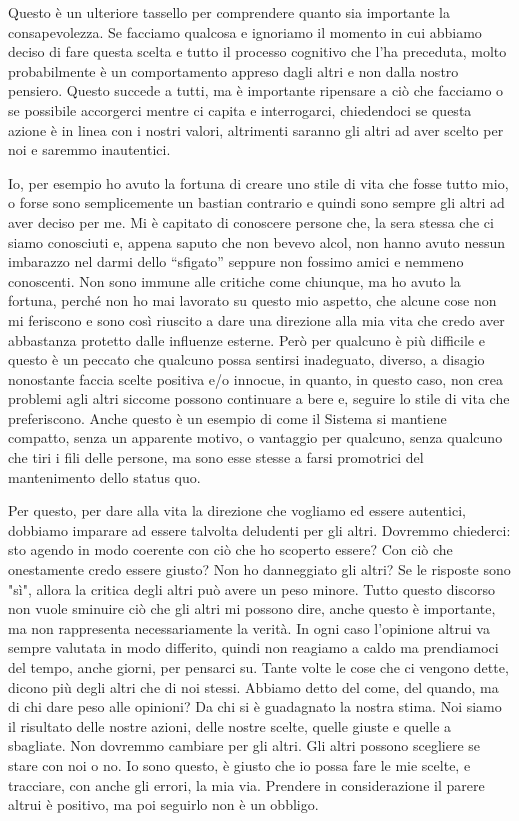 \documentclass[12pt]{book} %
\begin{document}
\bigskip

Questo è un ulteriore tassello per comprendere quanto sia importante la consapevolezza. Se facciamo qualcosa e ignoriamo
il momento in cui abbiamo deciso di fare questa scelta e tutto il processo cognitivo che l'ha
preceduta, molto probabilmente è un comportamento appreso dagli altri e non dalla nostro pensiero. Questo succede a
tutti, ma è importante ripensare a ciò che facciamo o se possibile accorgerci mentre ci capita e interrogarci,
chiedendoci se questa azione è in linea con i nostri valori, altrimenti saranno gli altri ad aver scelto per noi e
saremmo inautentici.


\bigskip

Io, per esempio ho avuto la fortuna di creare uno stile di vita che fosse tutto mio, o forse sono semplicemente un
bastian contrario e quindi sono sempre gli altri ad aver deciso per me. Mi è capitato di conoscere persone che, la sera
stessa che ci siamo conosciuti e, appena saputo che non bevevo alcol, non hanno avuto nessun imbarazzo nel darmi dello
“sfigato” seppure non fossimo amici e nemmeno conoscenti. Non sono immune alle critiche come chiunque, ma ho avuto la
fortuna, perché non ho mai lavorato su questo mio aspetto, che alcune cose non mi feriscono e sono così riuscito a dare
una direzione alla mia vita che credo aver abbastanza protetto dalle influenze esterne. Però per qualcuno è più
difficile e questo è un peccato che qualcuno possa sentirsi inadeguato, diverso, a disagio nonostante faccia scelte
positiva e/o innocue, in quanto, in questo caso, non crea problemi agli altri siccome possono continuare a bere e,
seguire lo stile di vita che preferiscono. Anche questo è un esempio di come il Sistema si mantiene compatto, senza un
apparente motivo, o vantaggio per qualcuno, senza qualcuno che tiri i fili delle persone, ma sono esse stesse a farsi
promotrici del mantenimento dello status quo. 

Per questo, per dare alla vita la direzione che vogliamo ed essere autentici, dobbiamo imparare ad essere talvolta
deludenti per gli altri.
Dovremmo chiederci: sto agendo in modo coerente con ciò che ho scoperto essere? Con ciò che onestamente credo essere giusto? Non ho danneggiato gli altri? Se le risposte sono "sì", allora la critica degli altri può avere un peso minore. Tutto questo discorso non vuole sminuire ciò che gli altri mi possono dire, anche questo è importante, ma non rappresenta necessariamente la verità.
In ogni caso l'opinione altrui va sempre valutata in modo differito, quindi non reagiamo a caldo ma prendiamoci del tempo, anche giorni, per pensarci su. Tante volte le cose che ci vengono dette, dicono più degli altri che di noi stessi.
Abbiamo detto del come, del quando, ma di chi dare peso alle opinioni? Da chi si è guadagnato la nostra stima.
Noi siamo il risultato delle nostre azioni, delle nostre scelte, quelle giuste e quelle a sbagliate. Non dovremmo cambiare per gli altri. Gli altri possono scegliere se stare con noi o no. Io sono questo, è giusto che io possa fare le mie scelte, e tracciare, con anche gli errori, la mia via.
Prendere in considerazione il parere altrui è positivo, ma poi seguirlo non è un obbligo. 
\end{document}
